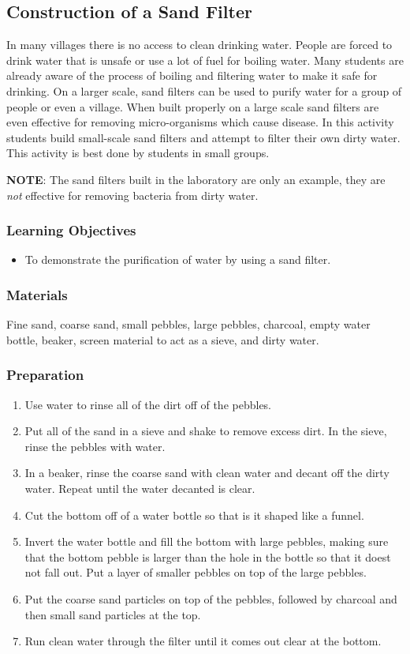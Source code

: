 \subsection{Construction of a Sand Filter}
In many villages there is no access to clean drinking water. People are forced to drink water that is unsafe or use a lot of fuel for boiling water. Many students are already aware of the process of boiling and filtering water to make it safe for drinking. On a larger scale, sand filters can be used to purify water for a group of people or even a village. When built properly on a large scale sand filters are even effective for removing micro-organisms which cause disease. In this activity students build small-scale sand filters and attempt to filter their own dirty water.  This activity is best done by students in small groups.

\textbf{NOTE}: The sand filters built in the laboratory are only an example, they are \textit{not} effective for removing bacteria from dirty water.
\subsubsection*{Learning Objectives}
\begin{itemize}
\item{To demonstrate the purification of water by using a sand filter.}
\end{itemize}

\subsubsection*{Materials}
Fine sand, coarse sand, small pebbles, large pebbles, charcoal, empty water bottle, beaker, screen material to act as a sieve, and dirty water.

\subsubsection*{Preparation}
\begin{enumerate}
\item{Use water to rinse all of the dirt off of the pebbles.}
\item{Put all of the sand in a sieve and shake to remove excess dirt. In the sieve, rinse the pebbles with water.}
\item{In a beaker, rinse the coarse sand with clean water and decant off the dirty water. Repeat until the water decanted is clear.}
\item{Cut the bottom off of a water bottle so that is it shaped like a funnel.}
\item{Invert the water bottle and fill the bottom with large pebbles, making sure that the bottom pebble is larger than the hole in the bottle so that it doest not fall out. Put a layer of smaller pebbles on top of the large pebbles.}
\item{Put the coarse sand particles on top of the pebbles, followed by charcoal and then small sand particles at the top.}

\item{Run clean water through the filter until it comes out clear at the bottom.}
\end{enumerate}

